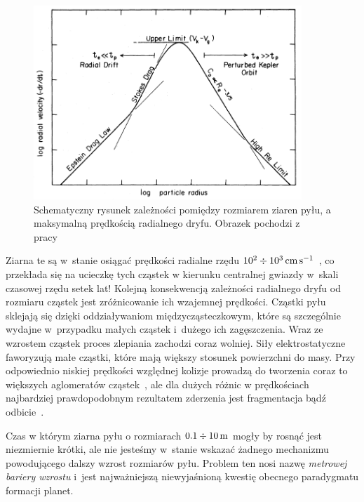\begin{figure}
   \includegraphics[width=0.9\textwidth]{figures/chap1_drift.png}
   \caption[Zależnośc pomiędzy rozmiarem pyłu, a maksymalną prędkością
   radialnego dryfu.]
   {Schematyczny rysunek zależności pomiędzy rozmiarem ziaren pyłu, a
   maksymalną prędkością radialnego dryfu. Obrazek pochodzi z
   pracy~\cite{W77}}
   \label{fig:chap1_drift}
\end{figure}

Ziarna te są w~stanie osiągać prędkości radialne rzędu
$10^2\div10^3\hbox{$\thinspace\textrm{cm}$}\hbox{$\thinspace\textrm{s}$}^{-1}$~\cite{W77}, co przekłada się na ucieczkę tych cząstek w
kierunku centralnej gwiazdy w~skali czasowej rzędu setek lat!  Kolejną
konsekwencją zależności radialnego dryfu od rozmiaru cząstek jest zróżnicowanie
ich wzajemnej prędkości. Cząstki pyłu sklejają się dzięki oddziaływaniom
międzycząsteczkowym, które są szczególnie wydajne w~przypadku małych cząstek
i~dużego ich zagęszczenia. Wraz ze wzrostem cząstek proces zlepiania zachodzi
coraz wolniej.  Siły elektrostatyczne faworyzują małe cząstki, które mają większy stosunek
powierzchni do masy. Przy odpowiednio niskiej prędkości względnej kolizje
prowadzą do tworzenia coraz to większych aglomeratów cząstek~\citep{BW08}, ale
dla dużych różnic w prędkościach najbardziej prawdopodobnym rezultatem zderzenia
jest fragmentacja bądź odbicie~\citep{Z10}. 

\par Czas w którym ziarna pyłu o rozmiarach $0.1 \div 10\hbox{$\thinspace\textrm{m}$}$ mogły
by rosnąć jest niezmiernie krótki, ale nie jesteśmy w~stanie wskazać żadnego
mechanizmu powodującego dalszy wzrost rozmiarów pyłu. Problem ten nosi nazwę
\emph{metrowej bariery wzrostu} i~jest najważniejszą niewyjaśnioną kwestię
obecnego paradygmatu formacji planet. 

